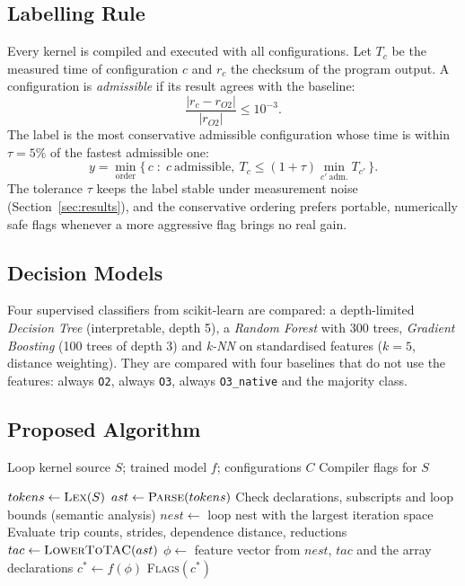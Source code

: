 

\subsection{Labelling Rule}

Every kernel is compiled and executed with all configurations. Let $T_c$ be the
measured time of configuration $c$ and $r_c$ the checksum of the program output. A
configuration is \emph{admissible} if its result agrees with the baseline:
\begin{equation}
\frac{|r_c-r_{O2}|}{|r_{O2}|} \le 10^{-3}.
\end{equation}
The label is the most conservative admissible configuration whose time is within
$\tau=5\%$ of the fastest admissible one:
\begin{equation}
y = \min_{\text{order}}\{\,c \;:\; c\ \text{admissible},\ T_c \le (1+\tau)\min_{c'\ \text{adm.}} T_{c'}\,\}.
\end{equation}
The tolerance $\tau$ keeps the label stable under measurement noise
(Section~\ref{sec:results}), and the conservative ordering prefers portable, numerically safe
flags whenever a more aggressive flag brings no real gain.

\subsection{Decision Models}

Four supervised classifiers from scikit-learn \cite{pedregosa2011} are compared: a depth-limited
\emph{Decision Tree} (interpretable, depth 5), a \emph{Random Forest} \cite{breiman2001} with
300 trees, \emph{Gradient Boosting} (100 trees of depth 3) and \emph{k-NN} on standardised features
($k=5$, distance weighting). They are compared with four baselines that do not use the features:
always \texttt{O2}, always \texttt{O3}, always \texttt{O3\_native} and the majority class.

\subsection{Proposed Algorithm}

\begin{algorithm}[H]
\caption{ML-Based Loop Optimisation Decision}
\label{alg:compiler}
\begin{algorithmic}[1]

\Require Loop kernel source $S$; trained model $f$; configurations $C$
\Ensure Compiler flags for $S$

\State $tokens \gets \textsc{Lex}(S)$
\State $ast \gets \textsc{Parse}(tokens)$
\State Check declarations, subscripts and loop bounds (semantic analysis)
\State $nest \gets$ loop nest with the largest iteration space
\State Evaluate trip counts, strides, dependence distance, reductions
\State $tac \gets \textsc{LowerToTAC}(ast)$
\State $\phi \gets$ feature vector from $nest$, $tac$ and the array declarations
\State $c^{*} \gets f(\phi)$
\State \Return \textsc{Flags}$(c^{*})$

\end{algorithmic}
\end{algorithm}

